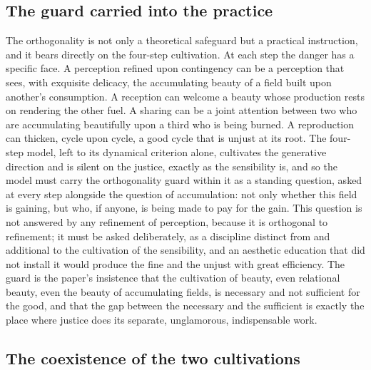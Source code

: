 \subsection{The guard carried into the practice}
\label{p22:sub:orth-into-practice}

The orthogonality is not only a theoretical safeguard but a practical instruction, and it bears directly on the four-step cultivation. At each step the danger has a specific face. A perception refined upon contingency can be a perception that sees, with exquisite delicacy, the accumulating beauty of a field built upon another's consumption. A reception can welcome a beauty whose production rests on rendering the other fuel. A sharing can be a joint attention between two who are accumulating beautifully upon a third who is being burned. A reproduction can thicken, cycle upon cycle, a good cycle that is unjust at its root. The four-step model, left to its dynamical criterion alone, cultivates the generative direction and is silent on the justice, exactly as the sensibility is, and so the model must carry the orthogonality guard within it as a standing question, asked at every step alongside the question of accumulation: not only whether this field is gaining, but who, if anyone, is being made to pay for the gain. This question is not answered by any refinement of perception, because it is orthogonal to refinement; it must be asked deliberately, as a discipline distinct from and additional to the cultivation of the sensibility, and an aesthetic education that did not install it would produce the fine and the unjust with great efficiency. The guard is the paper's insistence that the cultivation of beauty, even relational beauty, even the beauty of accumulating fields, is necessary and not sufficient for the good, and that the gap between the necessary and the sufficient is exactly the place where justice does its separate, unglamorous, indispensable work.

\subsection{The coexistence of the two cultivations}
\label{p22:sub:orth-coexist}

